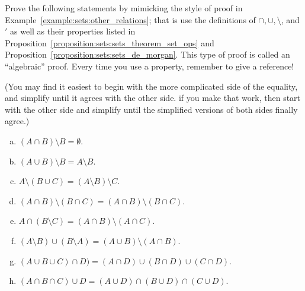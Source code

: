  
 
 
 
 

 
 
\begin{exercise}{30}
Prove the following statements by mimicking the style of proof in Example~\ref{example:sets:other_relations}; that is use the definitions of $\cap, \cup, \setminus$, and $'$ as well as their properties listed in Proposition~\ref{proposition:sets:sets_theorem_set_ops} and  Proposition~\ref{proposition:sets:sets_de_morgan}. This type of proof is called an ``algebraic'' proof.  Every time you use a property, remember to give a reference!

(You may find it easiest to begin with the more complicated side of the equality, and  simplify until it agrees with the other side. if you make that work, then start with the other side and simplify until the simplified versions of both sides finally agree.)

\begin{enumerate}[(a)]
\item
$(A \cap B) \setminus B = \emptyset$.
\item
$(A \cup B) \setminus B = A \setminus B$.
\item
$A \setminus (B \cup C) = (A \setminus B)  \setminus C$. 
\item
$(A \cap B) \setminus (B \cap C) = (A \cap B) \setminus (B \cap C)$.
\item
 $A \cap (B \setminus C) = (A \cap B) \setminus (A \cap C)$. 
\item
$(A \setminus B) \cup (B \setminus A) = (A \cup B) \setminus (A \cap B)$. 
\item
$(A \cup B \cup C) \cap D) = (A \cap D) \cup (B \cap D)\cup (C \cap D)$. 
\item
$(A \cap B \cap C) \cup D = (A \cup D) \cap (B \cup D)\cap (C \cup D)$. 
\end{enumerate}
\end{exercise}

